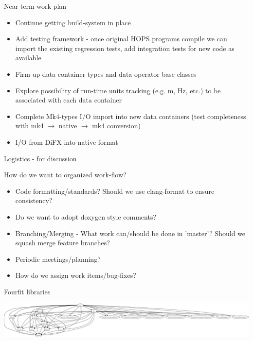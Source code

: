 \documentclass[xcolor=svgnames]{beamer}
\begin{document}
\begin{frame}{Near term work plan}
 
 \begin{itemize}
  \item Continue getting build-system in place
  \item Add testing framework - once original HOPS programs compile we can import the existing regression tests, add integration tests for new code as available
  \item Firm-up data container types and data operator base classes
  \item Explore possibility of run-time units tracking (e.g. m, Hz, etc.) to be associated with each data container
  \item Complete Mk4-types I/O import into new data containers (test completeness with mk4 $\rightarrow$ native $\rightarrow$ mk4 conversion)
  \item I/O from DiFX into native format
 \end{itemize}

 
\end{frame}

\begin{frame}{Logistics - for discussion}
 
 How do we want to organized work-flow?
 
\begin{itemize}
 \item Code formatting/standards? Should we use clang-format to ensure consistency?
 \item Do we want to adopt doxygen style comments?
 \item Branching/Merging - What work can/should be done in 'master'? Should we squash merge feature branches?
 \item Periodic meetings/planning? 
 \item How do we assign work items/bug-fixes?
\end{itemize}

  
\end{frame}



\begin{frame}{Fourfit libraries}

\begin{center}
      \includegraphics[width=\textwidth]{fourfit.png}\\
\end{center}

\end{frame}
\end{document}
